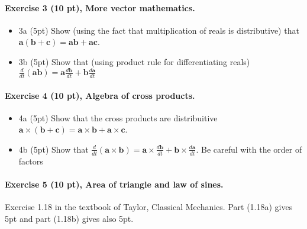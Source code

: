 \documentclass[%
oneside,                 %
final,                   %
10pt]{article}
\begin{document}
\noindent
\paragraph{Exercise 3 (10 pt), More vector mathematics.}
\begin{itemize}
\item 3a (5pt) Show (using the fact that multiplication of reals is distributive) that $\bm{a}(\bm{b}+\bm{c})=\bm{a}\bm{b}+\bm{a}\bm{c}$.

\item 3b (5pt) Show that (using product rule for differentiating reals)  $\frac{d}{dt}(\bm{a}\bm{b})=\bm{a}\frac{d\bm{b}}{dt}+\bm{b}\frac{d\bm{a}}{dt}$
\end{itemize}

\noindent
\paragraph{Exercise 4 (10 pt), Algebra of cross products.}
\begin{itemize}
\item 4a (5pt) Show that the cross products are distribuitive $\bm{a}\times(\bm{b}+\bm{c})=\bm{a}\times\bm{b}+\bm{a}\times\bm{c}$.

\item 4b (5pt) Show that $\frac{d}{dt}(\bm{a}\times\bm{b})=\bm{a}\times\frac{d\bm{b}}{dt}+\bm{b}\times\frac{d\bm{a}}{dt}$. Be careful with the order of factors 
\end{itemize}

\noindent
\paragraph{Exercise 5 (10 pt), Area of triangle and law of sines.}
Exercise 1.18 in the textbook of Taylor, Classical Mechanics. Part (1.18a) gives 5pt and part (1.18b) gives also 5pt.
\end{document}
